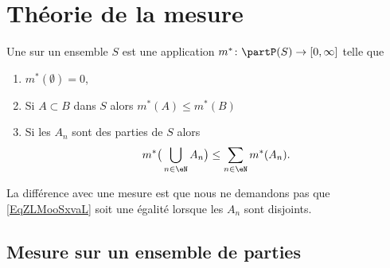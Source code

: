 \section{Théorie de la mesure}
\label{SecSLOooeMaig}

\begin{definition} \label{DefUMWoolmMaf}
	Une  sur un ensemble \( S\) est une application \( m^*\colon \partP(S)\to \mathopen[ 0 , \infty \mathclose]\) telle que
	\begin{enumerate}
		\item
		      \( m^*(\emptyset)=0\),
		\item
		      Si \( A\subset B\) dans \( S\) alors \( m^*(A)\leq m^*(B)\)
		\item   \label{ItemARKooppZfDaiii}
		      Si les \( A_n\) sont des parties de \( S\) alors
		      \begin{equation}    \label{EqZLMooSxvaL}
			      m^*\big( \bigcup_{n\in \eN}A_n \big)\leq \sum_{n\in \eN}m^*(A_n).
		      \end{equation}
	\end{enumerate}
\end{definition}
La différence avec une mesure est que nous ne demandons pas que \eqref{EqZLMooSxvaL} soit une égalité lorsque les \( A_n\) sont disjoints.

\subsection{Mesure sur un ensemble de parties}

